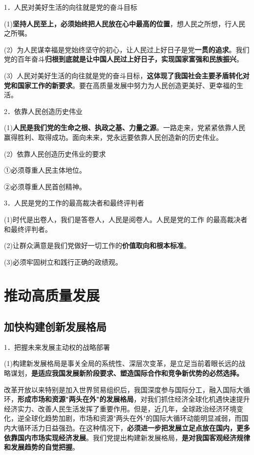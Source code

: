 \documentclass[lang=cn,10pt]{elegantbook}
\begin{document}
	1．人民对美好生活的向往就是党的奋斗目标
	
	(1)\textbf{坚持人民至上，必须始终把人民放在心中最高的位置}，想人民之所想，行人民之所嘱。
	
	(2）为人民谋幸福是党始终坚守的初心，让人民过上好日子是党\textbf{一贯的追求}。我们党的百年奋斗\textbf{归根到底就是让中国人民过上好日子，实现国家富强和民族振兴}。
	
	(3）人民对美好生活的向往就是党的奋斗目标，\textbf{这体现了我国社会主要矛盾转化对党和国家工作的新要求}。要在高质量发展中努力为人民创造更美好、更幸福的生活。
	
	2．依靠人民创造历史伟业
	
	(1)\textbf{人民是我们党的生命之根、执政之基、力量之源}。一路走来，党紧紧依靠人民赢得胜利、取得成功。面向未来，党永远要依靠人民创造新的历史伟业。
	
	(2）依靠人民创造历史伟业的要求
	
	①必须尊重人民主体地位。
	
	②必须尊重人民首创精神。
	
	3．人民是党的工作的最高裁决者和最终评判者
	
	(1)时代是出卷人，我们是答卷人，人民是阅卷人。人民是党的工作
	的最高裁决者和最终评判者。
	
	(2)让群众满意是我们党做好一切工作的\textbf{价值取向和根本标准}。
	
	(3)必须牢固树立和践行正确的政绩观。
	
	\chapter{推动高质量发展}
	\section{加快构建创新发展格局}
	
	1．把握未来发展主动权的战略部署
	
	(1)构建新发展格局是事关全局的系统性、深层次变革，是立足当前着眼长远的战略谋划，\textbf{是适应我国发展新阶段要求、塑造国际合作和竞争新优势的必然选择。}
	
	改革开放以来特别是加入世界贸易组织后，我国深度参与国际分工，融入国际大循环，\textbf{形成市场和资源"两头在外"的发展格局}，对我们抓住经济全球化机遇快速提升经济实力、改善人民生活发挥了重要作用。但是，近几年，全球政治经济环境变化，逆全球化趋势加剧，市场和资源"两头在外"的国际大循环动能明显减弱，而国内大循环活力日益强劲。在这种情况下，\textbf{必须进一步把发展立足点放在国内，更多依靠国内市场实现经济发展}。我们党提出构建新发展格局，\textbf{是对我国客观经济规律和发展趋势的自觉把握}。
	
\end{document}
